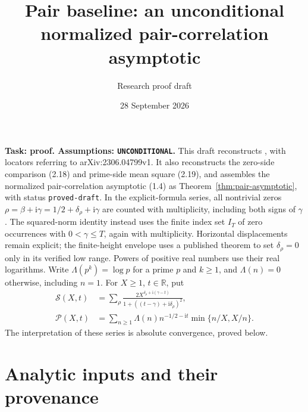 \documentclass[11pt]{article}
\title{Pair baseline: an unconditional normalized pair-correlation asymptotic}
\author{Research proof draft}
\date{28 September 2026}
\newcommand{\ii}{\mathrm i}
\newcommand{\ZS}{\mathcal S}
\newcommand{\PS}{\mathcal P}
\begin{document}
\maketitle

\noindent\textbf{Task: proof. Assumptions: \texttt{UNCONDITIONAL}.}
This draft reconstructs \cite[Lemmas 1--4, (2.2)--(2.16)]{BGSTB2024}, with locators
referring to arXiv:2306.04799v1. It also reconstructs the zero-side
comparison (2.18) and prime-side mean square (2.19), and assembles the
normalized pair-correlation asymptotic (1.4) as
Theorem~\ref{thm:pair-asymptotic}, with status \texttt{proved-draft}.
In the explicit-formula series, all nontrivial zeros
\(\rho=\beta+\ii\gamma=1/2+\delta_\rho+\ii\gamma\) are counted with
multiplicity, including both signs of \(\gamma\).
The squared-norm identity instead uses the finite index set \(I_T\)
of zero occurrences with \(0<\gamma\leq T\), again with multiplicity.
Horizontal displacements remain explicit; the finite-height envelope uses
a published theorem to set \(\delta_\rho=0\) only in its verified low range.
Powers of positive real numbers use their real logarithms.
Write \(\Lambda(p^k)=\log p\) for a prime \(p\) and \(k\geq1\),
and \(\Lambda(n)=0\) otherwise, including \(n=1\).
For \(X\geq1\), \(t\in\mathbb R\), put
\begin{align}
 \ZS(X,t)&=\sum_\rho
 \frac{2X^{\delta_\rho+\ii(\gamma-t)}}
 {1+((t-\gamma)+\ii\delta_\rho)^2},\label{eq:zero-sum}\\
 \PS(X,t)&=\sum_{n\geq1}\Lambda(n)n^{-1/2-\ii t}
                  \min\{n/X,X/n\}.\label{eq:prime-sum}
\end{align}
The interpretation of these series is absolute convergence, proved below.

\section{Analytic inputs and their provenance}\label{sec:analytic-inputs}
\end{document}
